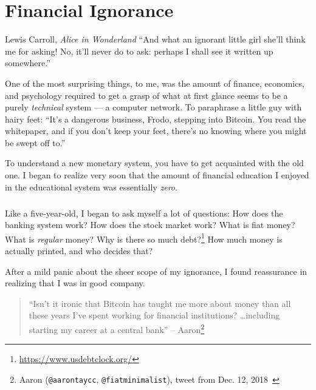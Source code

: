 \chapter{Financial Ignorance}
\label{les:8}

\begin{chapquote}{Lewis Carroll, \textit{Alice in Wonderland}}
\enquote{And what an ignorant little girl she'll think me for asking! No, it'll never
do to ask: perhaps I shall see it written up somewhere.}
\end{chapquote}

One of the most surprising things, to me, was the amount of finance,
economics, and psychology required to get a grasp of what at first
glance seems to be a purely \textit{technical} system --- a computer network.
To paraphrase a little guy with hairy feet: \enquote{It's a dangerous business,
Frodo, stepping into Bitcoin. You read the whitepaper, and if you don't
keep your feet, there's no knowing where you might be swept off to.}

To understand a new monetary system, you have to get acquainted with the
old one. I began to realize very soon that the amount of financial
education I enjoyed in the educational system was essentially \textit{zero}.

\paragraph{}
Like a five-year-old, I began to ask myself a lot of questions: How does the
banking system work? How does the stock market work? What is fiat money? What is
\textit{regular} money? Why is there so much
debt?\footnote{\url{https://www.usdebtclock.org/}} How much money is actually
printed, and who decides that?

\newpage

After a mild panic about the sheer scope of my ignorance, I found
reassurance in realizing that I was in good company.

\begin{quotation}\begin{samepage}
\enquote{Isn't it ironic that Bitcoin has taught me more about money than all these
years I've spent working for financial institutions? \ldots including starting my
career at a central bank}
\flushright -- Aaron\footnote{Aaron (\texttt{@aarontaycc}, \texttt{@fiatminimalist}), tweet from Dec.
12, 2018~\cite{aarontaycc-tweet}}
\end{samepage}\end{quotation}

